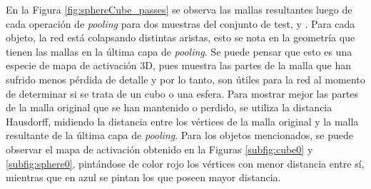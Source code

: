 En la Figura \ref{fig:sphereCube_passes} se observa las mallas resultantes luego de cada operación de \textit{pooling} para dos muestras del conjunto de test,  y . Para cada objeto, la red está colapsando distintas aristas, esto se nota en la geometría que tienen las mallas en la última capa de \textit{pooling}. Se puede pensar que esto es una especie de mapa de activación 3D, pues muestra las partes de la malla que han sufrido menos pérdida de detalle y por lo tanto, son útiles para la red al momento de determinar si se trata de un cubo o una esfera. Para mostrar mejor las partes de la malla original que se han mantenido o perdido, se utiliza la distancia Hausdorff, midiendo la distancia entre los vértices de la malla original y la malla resultante de la última capa de \textit{pooling}. Para los objetos mencionados, se puede observar el mapa de activación obtenido en la Figuras \ref{subfig:cube0} y \ref{subfig:sphere0}, pintándose de color rojo los vértices con menor distancia entre sí, mientras que en azul se pintan los que poseen mayor distancia.

